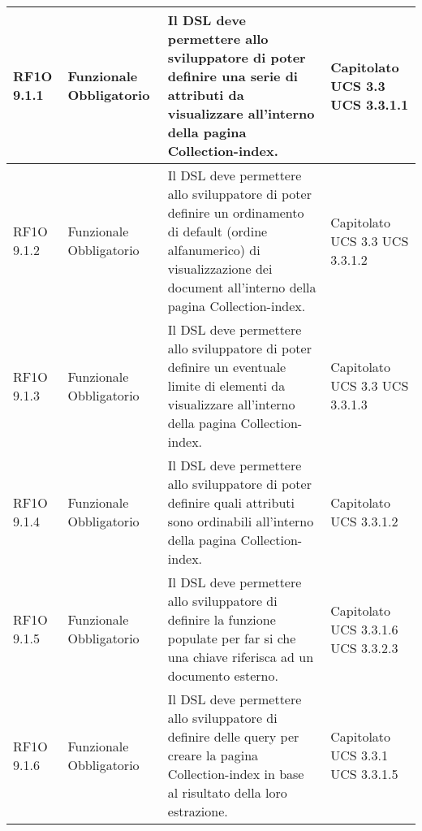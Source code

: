 \begin{center}
\begin{longtable}{ | l | p{2cm} | p{5cm} | p{1.7cm} |}
        RF1O 9.1.1 & Funzionale \newline  Obbligatorio  & Il DSL deve permettere allo sviluppatore di poter definire una serie di attributi da visualizzare all’interno della pagina Collection-index. &  Capitolato \newline  UCS 3.3 \newline  UCS 3.3.1.1 \newline  \\ \hline      
        RF1O 9.1.2 & Funzionale \newline  Obbligatorio  & Il DSL deve permettere allo sviluppatore di poter definire un ordinamento di default (ordine alfanumerico) di visualizzazione dei document all'interno della pagina Collection-index. &  Capitolato \newline  UCS 3.3 \newline  UCS 3.3.1.2 \newline  \\ \hline      
        RF1O 9.1.3 & Funzionale \newline  Obbligatorio  & Il DSL deve permettere allo sviluppatore di poter definire un eventuale limite di elementi da visualizzare all’interno della pagina Collection-index. &  Capitolato \newline  UCS 3.3 \newline  UCS 3.3.1.3 \newline  \\ \hline      
        RF1O 9.1.4 & Funzionale \newline  Obbligatorio  & Il DSL deve permettere allo sviluppatore di poter definire quali attributi sono ordinabili all’interno della pagina Collection-index. &  Capitolato \newline  UCS 3.3.1.2 \newline  \\ \hline      
        RF1O 9.1.5 & Funzionale \newline  Obbligatorio  & Il DSL deve permettere allo sviluppatore di definire la funzione populate per far si che una chiave riferisca ad un documento esterno. &  Capitolato \newline  UCS 3.3.1.6 \newline  UCS 3.3.2.3 \newline  \\ \hline      
        RF1O 9.1.6 & Funzionale \newline  Obbligatorio  & Il DSL deve permettere allo sviluppatore di definire delle query per creare la pagina Collection-index in base al risultato della loro estrazione. &  Capitolato \newline  UCS 3.3.1 \newline  UCS 3.3.1.5 \newline  \\ \hline      

\end{longtable}
\end{center}
